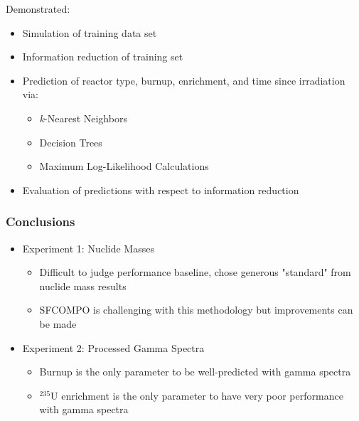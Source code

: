 \begin{frame}
\begin{adjustwidth}{-15pt}{-10pt}
\begin{minipage}{0.65\textwidth}
\begin{block}{Demonstrated:}
      \small
      \begin{itemize}
        \itemsep 0.1em 
        \item Simulation of training data set
        \item Information reduction of training set
        \item Prediction of reactor type, burnup, enrichment, and time since irradiation via:
          \begin{itemize}
            \item \textit{k}-Nearest Neighbors
            \item Decision Trees
            \item Maximum Log-Likelihood Calculations
          \end{itemize}
        \item Evaluation of predictions with respect to information reduction
      \end{itemize}
    \end{block}
  \end{minipage}
  \end{adjustwidth}
\end{frame}

\begin{frame}
  \frametitle{Conclusions}
  \begin{itemize}
    \item Experiment 1: Nuclide Masses
      \begin{itemize}
        \item Difficult to judge performance baseline, chose generous "standard" from nuclide mass results
        \item SFCOMPO is challenging with this methodology but improvements can be made
      \end{itemize}
    \item Experiment 2: Processed Gamma Spectra
      \begin{itemize}
        \item Burnup is the only parameter to be well-predicted with gamma spectra
        \item ${}^{235}\text{U}$ enrichment is the only parameter to have very poor performance with gamma spectra
      \end{itemize}
    \end{itemize}
\end{frame}

